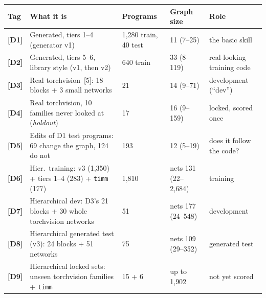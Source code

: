 \documentclass[10pt]{article}
\newcommand{\tg}[1]{\textcolor{tagc}{\textbf{[#1]}}}
\begin{document}
\begin{center}
\scriptsize
{}
\begin{tabularx}{\textwidth}{@{}lXlll@{}}
\toprule
Tag & What it is & Programs & Graph size & Role\\
\midrule
\tg{D1} & Generated, tiers 1--4 (generator v1) & 1{,}280 train, 40 test & 11 (7--25) & the basic skill\\
\tg{D2} & Generated, tiers 5--6, library style (v1, then v2) & 640 train & 33 (8--119) & real-looking training code\\
\tg{D3} & Real torchvision~[5]: 18 blocks + 3 small networks & 21 & 14 (9--71) & development (``dev'')\\
\tg{D4} & Real torchvision, 10 families never looked at (\emph{holdout}) & 17 & 16 (9--159) & locked, scored once\\
\tg{D5} & Edits of D1 test programs: 69 change the graph, 124 do not & 193 & 12 (5--19) & does it follow the code?\\
\tg{D6} & Hier.\ training: v3 (1{,}350) + tiers 1--4 (283) + \texttt{timm} (177) & 1{,}810 & nets 131 (22--2{,}684) & training\\
\tg{D7} & Hierarchical dev: D3's 21 blocks + 30 whole torchvision networks & 51 & nets 177 (24--548) & development\\
\tg{D8} & Hierarchical generated test (v3): 24 blocks + 51 networks & 75 & nets 109 (29--352) & generated test\\
\tg{D9} & Hierarchical locked sets: unseen torchvision families + \texttt{timm} & 15 + 6 & up to 1{,}902 & not yet scored\\
\bottomrule
\end{tabularx}
\end{center}
\end{document}
